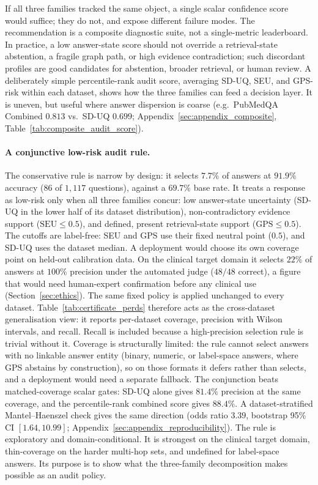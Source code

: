 If all three families tracked the same object, a single scalar confidence
score would suffice; they do not, and expose different failure modes.
The recommendation is a composite diagnostic suite, not a single-metric
leaderboard. In practice, a low answer-state score should not override a
retrieval-state abstention, a fragile graph path, or high evidence
contradiction; such discordant profiles are good candidates for abstention,
broader retrieval, or human review.
A deliberately simple percentile-rank audit score, averaging SD-UQ, SEU, and
GPS-risk within each dataset, shows how the three families can feed a decision
layer. It is uneven, but useful where answer dispersion is coarse
(e.g.\ PubMedQA Combined $0.813$ vs.\ SD-UQ $0.699$;
Appendix~\ref{sec:appendix_composite},
Table~\ref{tab:composite_audit_score}).

\paragraph{A conjunctive low-risk audit rule.}
The conservative rule is narrow by design: it selects $7.7\%$ of answers at
$91.9\%$ accuracy ($86$ of $1{,}117$ questions), against a $69.7\%$ base rate.
It treats a response as low-risk only when all three families concur: low
answer-state uncertainty (SD-UQ in the lower half of its dataset
distribution), non-contradictory evidence support ($\mathrm{SEU} \leq 0.5$),
and defined, present retrieval-state support ($\mathrm{GPS} \leq 0.5$).
The cutoffs are label-free: SEU and GPS use their fixed neutral point ($0.5$),
and SD-UQ uses the dataset median. A deployment would choose its own coverage
point on held-out calibration data.
On the clinical target domain it selects $22\%$ of answers at $100\%$ precision
under the automated judge ($48/48$ correct), a figure that would need
human-expert confirmation before any clinical use (Section~\ref{sec:ethics}).
The same fixed policy is applied unchanged to every dataset. Table~\ref{tab:certificate_perds}
therefore acts as the cross-dataset generalisation view: it reports
per-dataset coverage, precision with Wilson intervals, and recall. Recall is
included because a high-precision selection rule is trivial without it.
Coverage is structurally limited: the rule cannot select answers
with no linkable answer entity (binary, numeric, or label-space answers, where
GPS abstains by construction), so on those formats it defers rather than
selects, and a deployment would need a separate fallback.
The conjunction beats matched-coverage scalar gates: SD-UQ alone gives
$81.4\%$ precision at the same coverage, and the percentile-rank combined score
gives $88.4\%$. A dataset-stratified Mantel--Haenszel check gives the same
direction (odds ratio $3.39$, bootstrap 95\% CI $[1.64, 10.99]$;
Appendix~\ref{sec:appendix_reproducibility}).
The rule is exploratory and domain-conditional. It is strongest on the clinical
target domain, thin-coverage on the harder multi-hop sets, and undefined for
label-space answers. Its purpose is to show what the three-family decomposition
makes possible as an audit policy.

